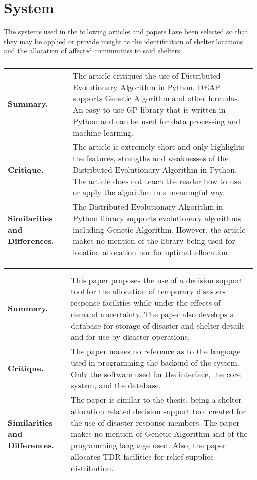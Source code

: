 \section{System}

The systems used in the following articles and papers have been selected so that they may be applied or provide insight to the identification of shelter locations and the allocation of affected communities to said shelters.

\begin{longtable}{|L{.2\linewidth}|L{.74\linewidth}|}
	\hline
	\\ \hline
	\textbf{Summary.} & The article critiques the use of Distributed Evolutionary Algorithm in Python.  DEAP supports Genetic Algorithm and other formulas. An easy to use GP library that is written in Python and can be used for data processing and machine learning.\\ \hline
	\textbf{Critique.} & The article is extremely short and only highlights the features, strengths and weaknesses of the Distributed Evolutionary Algorithm in Python. The article does not teach the reader how to use or apply the algorithm in a meaningful way.\\ \hline
	\textbf{Similarities and Differences.} & The Distributed Evolutionary Algorithm in Python library supports evolutionary algorithms including Genetic Algorithm. However, the article makes no mention of the library being used for location allocation nor for optimal allocation. \\ \hline
\end{longtable}

\begin{longtable}{|L{.2\linewidth}|L{.74\linewidth}|}
	\hline
	\\ \hline
	\textbf{Summary.} & This paper proposes the use of a decision support tool for the allocation of temporary disaster-response facilities while under the effects of demand uncertainty.  The paper also develops a database for storage of disaster and shelter details and for use by disaster operations.\\ \hline
	\textbf{Critique.} & The paper makes no reference as to the language used in programming the backend of the system. Only the software used for the interface, the core system, and the database.\\ \hline
	\textbf{Similarities and Differences.} & The paper is similar to the thesis, being a shelter allocation related decision support tool created for the use of disaster-response members. The paper makes no mention of Genetic Algorithm and of the programming language used. Also, the paper allocates TDR facilities for relief supplies distribution.\\ \hline
\end{longtable}


